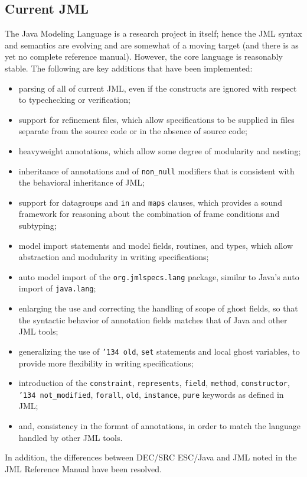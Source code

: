 \documentclass{acm_proc_article-sp}
\begin{document}
\subsection{Current JML}
The Java Modeling Language is a research project in itself; hence the
JML syntax and semantics are evolving and are somewhat of a moving
target (and there is as yet no complete reference manual).  However,
the core language is reasonably stable.  The following are key
additions that have been implemented:
\setlength{\partopsep}{0in}\setlength{\parskip}{0in}\setlength{\itemsep}{0in}\setlength{\topsep}{0in}
\begin{itemize}
\setlength{\partopsep}{0in}\setlength{\parskip}{0in}\setlength{\itemsep}{0in}\setlength{\topsep}{0in}
\item parsing of all of current JML, even if the constructs are
  ignored with respect to typechecking or verification;
\item support for refinement files, which allow specifications to be supplied in files separate from the source code or in the absence of source code;
\item heavyweight annotations, which allow some degree of modularity and nesting;
\item inheritance of annotations and of \texttt{non\_null}
  modifiers that is consistent with the behavioral inheritance of JML;
\item support for datagroups and \texttt{in} and \texttt{maps} clauses, which provides a sound framework for reasoning about the combination of frame conditions and subtyping;
\item model import statements and model fields, routines, and types, which allow abstraction 
and modularity in writing specifications;
\item auto model import of the \texttt{org.jmlspecs.lang} package, similar to Java's auto import of \texttt{java.lang};
\item enlarging the use and correcting the handling of scope of ghost fields, so that the syntactic behavior 
of annotation fields matches that of Java and other JML tools;
\item generalizing the use of \texttt{\char'134 old}, \texttt{set} statements and local ghost variables, to provide more flexibility in writing specifications;
\item introduction of the \texttt{constraint}, \texttt{represents}, \texttt{field}, \texttt{method},
\texttt{constructor}, 
\texttt{\char'134 not\_modified}, \texttt{forall}, \texttt{old}, \texttt{instance}, \texttt{pure} keywords as defined in JML;
\item and, consistency in the format of annotations, in order to match the language handled by other JML tools.
\end{itemize}
In addition, the differences between DEC/SRC ESC/Java and JML noted in the JML
Reference Manual have been resolved.
\end{document}
